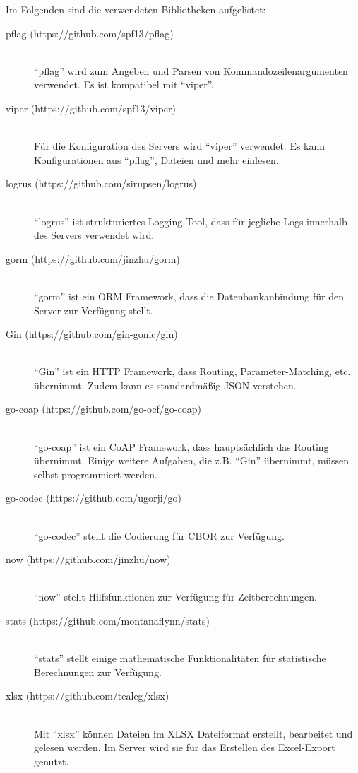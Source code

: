 Im Folgenden sind die verwendeten Bibliotheken aufgelistet:
\begin{description}
	\item[pflag (https://github.com/spf13/pflag)] \hfill \\
		\enquote{pflag} wird zum Angeben und Parsen von Kommandozeilenargumenten verwendet. Es ist kompatibel mit \enquote{viper}.
	\item[viper (https://github.com/spf13/viper)] \hfill \\
		Für die Konfiguration des Servers wird \enquote{viper} verwendet. Es kann Konfigurationen aus \enquote{pflag}, Dateien und mehr einlesen.
	\item[logrus (https://github.com/sirupsen/logrus)] \hfill \\
		\enquote{logrus} ist strukturiertes Logging-Tool, dass für jegliche Logs innerhalb des Servers verwendet wird.
	\item[gorm (https://github.com/jinzhu/gorm)] \hfill \\
		\enquote{gorm} ist ein \gls{ORM} Framework, dass die Datenbankanbindung für den Server zur Verfügung stellt.
	\item[Gin (https://github.com/gin-gonic/gin)] \hfill \\
		\enquote{Gin} ist ein HTTP Framework, dass Routing, Parameter-Matching, etc. übernimmt. Zudem kann es standardmäßig \gls{JSON} verstehen.
	\item[go-coap (https://github.com/go-ocf/go-coap)] \hfill \\
		\enquote{go-coap} ist ein \gls{CoAP} Framework, dass hauptsächlich das Routing übernimmt. Einige weitere Aufgaben, die z.B. \enquote{Gin} übernimmt, müssen selbst programmiert werden.
	\item[go-codec (https://github.com/ugorji/go)] \hfill \\
		\enquote{go-codec} stellt die Codierung für \gls{CBOR} zur Verfügung.
	\item[now (https://github.com/jinzhu/now)] \hfill \\
		\enquote{now} stellt Hilfsfunktionen zur Verfügung für Zeitberechnungen.
	\item[stats (https://github.com/montanaflynn/stats)] \hfill \\
		\enquote{stats} stellt einige mathematische Funktionalitäten für statistische Berechnungen zur Verfügung.
	\item[xlsx (https://github.com/tealeg/xlsx)] \hfill \\
		Mit \enquote{xlsx} können Dateien im \gls{XLSX} Dateiformat erstellt, bearbeitet und gelesen werden. Im Server wird sie für das Erstellen des Excel-Export genutzt.

\end{description}
